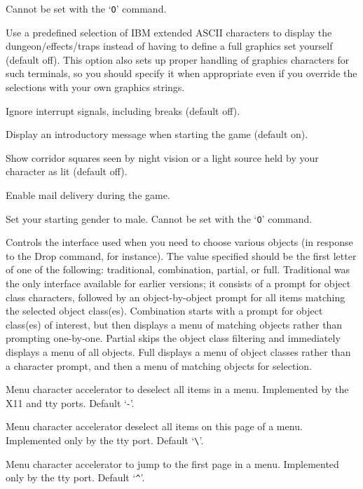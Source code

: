 Cannot be set with the `{\tt O}' command.
\item[\ib{IBMgraphics}]
Use a predefined selection of IBM extended ASCII characters to display the
dungeon/effects/traps instead of having to define a full graphics set
yourself (default off).
This option also sets up proper handling of graphics
characters for such terminals, so you should specify it when appropriate
even if you override the selections with your own graphics strings.
\item[\ib{ignintr}]
Ignore interrupt signals, including breaks (default off).
\item[\ib{legacy}]
Display an introductory message when starting the game (default on).
\item[\ib{lit\_corridor}]
Show corridor squares seen by night vision or a light source held by your
character as lit (default off).
\item[\ib{mail}]
Enable mail delivery during the game.
\item[\ib{male}]
Set your starting gender to male.
Cannot be set with the `{\tt O}' command.
\item[\ib{menustyle}]
Controls the interface used when you need to choose various objects (in
response to the Drop command, for instance).  The value specified should
be the first letter of one of the following:  traditional, combination,
partial, or full.  Traditional was the only interface available for
earlier versions; it consists of a prompt for object class characters,
followed by an object-by-object prompt for all items matching the selected
object class(es).  Combination starts with a prompt for object class(es)
of interest, but then displays a menu of matching objects rather than
prompting one-by-one.  Partial skips the object class filtering and
immediately displays a menu of all objects.  Full displays a menu of
object classes rather than a character prompt, and then a menu of matching
objects for selection.
\item[\ib{menu\_deselect\_all}]
Menu character accelerator to deselect all items in a menu.
Implemented by the X11 and tty ports.
Default `-'.
\item[\ib{menu\_deselect\_page}]
Menu character accelerator deselect all items on this page of a menu.
Implemented only by the tty port.
Default `\verb+\+'.
\item[\ib{menu\_first\_page}]
Menu character accelerator to jump to the first page in a menu.
Implemented only by the tty port.
Default `\verb+^+'.
\item[\ib{menu\_invert\_all}]
